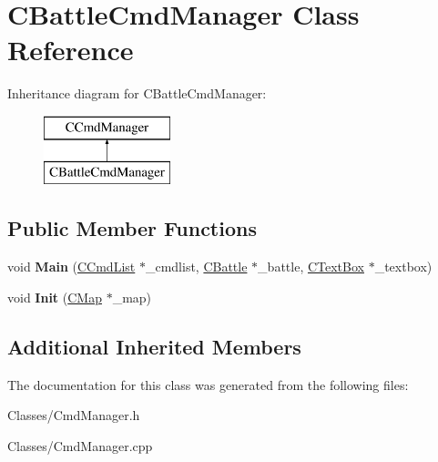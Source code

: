 \hypertarget{class_c_battle_cmd_manager}{}\section{C\+Battle\+Cmd\+Manager Class Reference}
\label{class_c_battle_cmd_manager}
Inheritance diagram for C\+Battle\+Cmd\+Manager\+:\begin{figure}[H]
\begin{center}
\leavevmode
\includegraphics[height=2.000000cm]{class_c_battle_cmd_manager}
\end{center}
\end{figure}
\subsection*{Public Member Functions}
\begin{DoxyCompactItemize}
\item 
void {\bfseries Main} (\hyperlink{class_c_cmd_list}{C\+Cmd\+List} $\ast$\+\_\+cmdlist, \hyperlink{class_c_battle}{C\+Battle} $\ast$\+\_\+battle, \hyperlink{class_c_text_box}{C\+Text\+Box} $\ast$\+\_\+textbox)\hypertarget{class_c_battle_cmd_manager_a723ecfc71b6ab435f8573129ac067383}{}\label{class_c_battle_cmd_manager_a723ecfc71b6ab435f8573129ac067383}

\item 
void {\bfseries Init} (\hyperlink{class_c_map}{C\+Map} $\ast$\+\_\+map)\hypertarget{class_c_battle_cmd_manager_a564491ec7efb0db3f60cd826e2fecc62}{}\label{class_c_battle_cmd_manager_a564491ec7efb0db3f60cd826e2fecc62}

\end{DoxyCompactItemize}
\subsection*{Additional Inherited Members}


The documentation for this class was generated from the following files\+:\begin{DoxyCompactItemize}
\item 
Classes/Cmd\+Manager.\+h\item 
Classes/Cmd\+Manager.\+cpp\end{DoxyCompactItemize}
